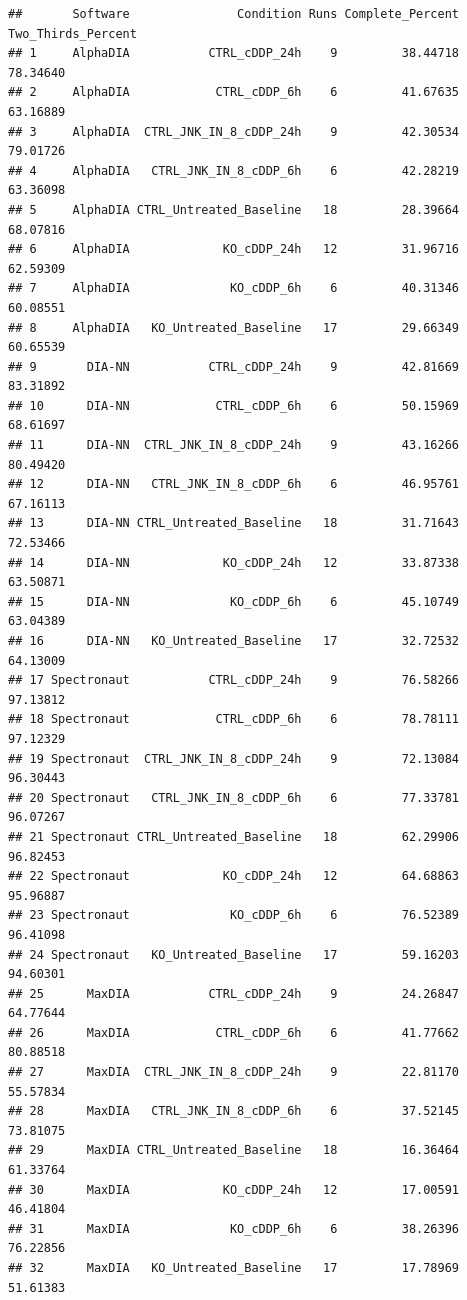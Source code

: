 \documentclass[
  10pt,
]{article}
\begin{document}
\begin{verbatim}
##       Software               Condition Runs Complete_Percent Two_Thirds_Percent
## 1     AlphaDIA           CTRL_cDDP_24h    9         38.44718           78.34640
## 2     AlphaDIA            CTRL_cDDP_6h    6         41.67635           63.16889
## 3     AlphaDIA  CTRL_JNK_IN_8_cDDP_24h    9         42.30534           79.01726
## 4     AlphaDIA   CTRL_JNK_IN_8_cDDP_6h    6         42.28219           63.36098
## 5     AlphaDIA CTRL_Untreated_Baseline   18         28.39664           68.07816
## 6     AlphaDIA             KO_cDDP_24h   12         31.96716           62.59309
## 7     AlphaDIA              KO_cDDP_6h    6         40.31346           60.08551
## 8     AlphaDIA   KO_Untreated_Baseline   17         29.66349           60.65539
## 9       DIA-NN           CTRL_cDDP_24h    9         42.81669           83.31892
## 10      DIA-NN            CTRL_cDDP_6h    6         50.15969           68.61697
## 11      DIA-NN  CTRL_JNK_IN_8_cDDP_24h    9         43.16266           80.49420
## 12      DIA-NN   CTRL_JNK_IN_8_cDDP_6h    6         46.95761           67.16113
## 13      DIA-NN CTRL_Untreated_Baseline   18         31.71643           72.53466
## 14      DIA-NN             KO_cDDP_24h   12         33.87338           63.50871
## 15      DIA-NN              KO_cDDP_6h    6         45.10749           63.04389
## 16      DIA-NN   KO_Untreated_Baseline   17         32.72532           64.13009
## 17 Spectronaut           CTRL_cDDP_24h    9         76.58266           97.13812
## 18 Spectronaut            CTRL_cDDP_6h    6         78.78111           97.12329
## 19 Spectronaut  CTRL_JNK_IN_8_cDDP_24h    9         72.13084           96.30443
## 20 Spectronaut   CTRL_JNK_IN_8_cDDP_6h    6         77.33781           96.07267
## 21 Spectronaut CTRL_Untreated_Baseline   18         62.29906           96.82453
## 22 Spectronaut             KO_cDDP_24h   12         64.68863           95.96887
## 23 Spectronaut              KO_cDDP_6h    6         76.52389           96.41098
## 24 Spectronaut   KO_Untreated_Baseline   17         59.16203           94.60301
## 25      MaxDIA           CTRL_cDDP_24h    9         24.26847           64.77644
## 26      MaxDIA            CTRL_cDDP_6h    6         41.77662           80.88518
## 27      MaxDIA  CTRL_JNK_IN_8_cDDP_24h    9         22.81170           55.57834
## 28      MaxDIA   CTRL_JNK_IN_8_cDDP_6h    6         37.52145           73.81075
## 29      MaxDIA CTRL_Untreated_Baseline   18         16.36464           61.33764
## 30      MaxDIA             KO_cDDP_24h   12         17.00591           46.41804
## 31      MaxDIA              KO_cDDP_6h    6         38.26396           76.22856
## 32      MaxDIA   KO_Untreated_Baseline   17         17.78969           51.61383
\end{verbatim}
\end{document}
